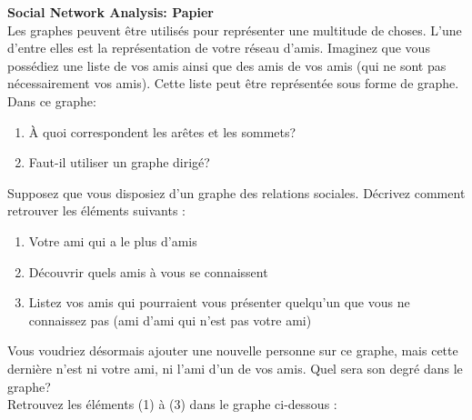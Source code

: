 \begin{Exercice}[10 minutes] \textbf{Social Network Analysis: Papier}\\
    Les graphes peuvent être utilisés pour représenter une multitude de choses.  L'une d'entre elles est la représentation de votre réseau d'amis. Imaginez que vous possédiez une liste de vos amis ainsi que des amis de vos amis (qui ne sont pas nécessairement vos amis). Cette liste peut être représentée sous forme de graphe. Dans ce graphe\!:
    \begin{enumerate}
        \item  À quoi correspondent les arêtes et les sommets? 
        \item Faut-il utiliser un graphe dirigé?
    \end{enumerate}
    Supposez que vous disposiez d'un graphe des relations sociales. Décrivez comment retrouver les éléments suivants :
    \begin{enumerate}
        \item Votre ami qui a le plus d'amis
        \item Découvrir quels amis à vous se connaissent
        \item Listez vos amis qui pourraient vous présenter quelqu'un que vous ne connaissez pas (ami d'ami qui n'est pas votre ami)
    \end{enumerate}
    Vous voudriez désormais ajouter une nouvelle personne sur ce graphe, mais cette dernière n'est ni votre ami, ni l'ami d'un de vos amis. Quel sera son degré dans le graphe?\\
    
    Retrouvez les éléments (1) à (3) dans le graphe ci-dessous :\\
    \begin{center}
\end{center}
\end{Exercice}

